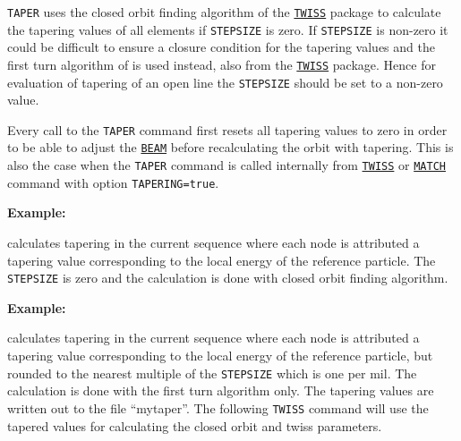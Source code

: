 \texttt{TAPER} uses the closed orbit finding algorithm of the
\hyperref[chap:twiss]{\texttt{TWISS}} package to calculate the
tapering values of all elements if \texttt{STEPSIZE} is zero.
If \texttt{STEPSIZE} is non-zero it could be difficult to ensure a
closure condition for the tapering values and the first turn algorithm
of \madx is used instead, also from the
\hyperref[chap:twiss]{\texttt{TWISS}} package. Hence for evaluation of
tapering of an open line the \texttt{STEPSIZE} should be set to a
non-zero value.   

Every call to the \texttt{TAPER} command first resets all tapering
values to zero in order to be able to adjust the
\hyperref[chap:beam]{\texttt{BEAM}} before recalculating the orbit with
tapering. This is also the case when the \texttt{TAPER} command is
called internally from \hyperref[chap:twiss]{\texttt{TWISS}} or
\hyperref[chap:match]{\texttt{MATCH}} command with option
\texttt{TAPERING=true}.  

\textbf{Example:}

calculates tapering in the current sequence where each node is
attributed a tapering value corresponding to the local energy of the
reference particle. The \texttt{STEPSIZE} is zero and the calculation is
done with closed orbit finding algorithm.


\textbf{Example:}

calculates tapering in the current sequence where each node is
attributed a tapering value corresponding to the local energy of the
reference particle, but rounded to the nearest multiple of the
\texttt{STEPSIZE} which is one per mil. The calculation is done with the
first turn algorithm only. The tapering values are written out to the
file ``mytaper''. The following \texttt{TWISS} command will use the
tapered values for calculating the closed orbit and twiss parameters. 


